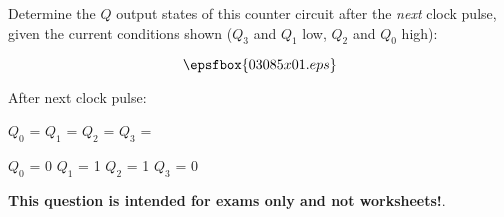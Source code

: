 

Determine the $Q$ output states of this counter circuit after the {\it next} clock pulse, given the current conditions shown ($Q_3$ and $Q_1$ low, $Q_2$ and $Q_0$ high):

$$\epsfbox{03085x01.eps}$$

After next clock pulse:

\vskip 10pt

$Q_0$ = \hskip 50pt $Q_1$ = \hskip 50pt $Q_2$ = \hskip 50pt $Q_3$ =







$Q_0$ = 0 \hskip 50pt $Q_1$ = 1 \hskip 50pt $Q_2$ = 1 \hskip 50pt $Q_3$ = 0







{\bf This question is intended for exams only and not worksheets!}.




